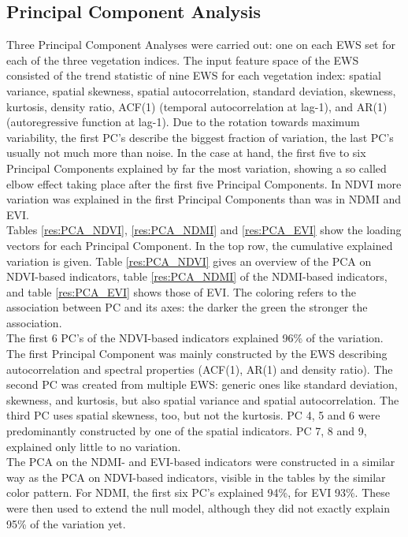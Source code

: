 

\newpage
\FloatBarrier
\subsection{Principal Component Analysis}\label{res_pca}
Three Principal Component Analyses were carried out: one on each EWS set for each of the three vegetation indices. The input feature space of the EWS consisted of the trend statistic of nine EWS for each vegetation index: spatial variance, spatial skewness, spatial autocorrelation, standard deviation, skewness, kurtosis, density ratio, ACF(1) (temporal autocorrelation at lag-1), and AR(1) (autoregressive function at lag-1). Due to the rotation towards maximum variability, the first PC's describe the biggest fraction of variation, the last PC's usually not much more than noise. In the case at hand, the first five to six Principal Components explained by far the most variation, showing a so called elbow effect taking place after the first five Principal Components. In NDVI more variation was explained in the first Principal Components than was in NDMI and EVI.\\
Tables \ref{res:PCA_NDVI}, \ref{res:PCA_NDMI} and \ref{res:PCA_EVI} show the loading vectors for each Principal Component. In the top row, the cumulative explained variation is given. Table \ref{res:PCA_NDVI} gives an overview of the PCA on NDVI-based indicators, table \ref{res:PCA_NDMI} of the NDMI-based indicators, and table \ref{res:PCA_EVI} shows those of EVI. The coloring refers to the association between PC and its axes: the darker the green the stronger the association.\\
The first 6 PC's of the NDVI-based indicators explained 96\% of the variation. The first Principal Component was mainly constructed by the EWS describing autocorrelation and spectral properties (ACF(1), AR(1) and density ratio). The second PC was created from multiple EWS: generic ones like standard deviation, skewness, and kurtosis, but also spatial variance and spatial autocorrelation. The third PC uses spatial skewness, too, but not the kurtosis. PC 4, 5 and 6 were predominantly constructed by one of the spatial indicators. PC 7, 8 and 9, explained only little to no variation.\\
The PCA on the NDMI- and EVI-based indicators were constructed in a similar way as the PCA on NDVI-based indicators, visible in the tables by the similar color pattern. For NDMI, the first six PC's explained 94\%, for EVI 93\%. These were then used to extend the null model, although they did not exactly explain 95\% of the variation yet.\\
